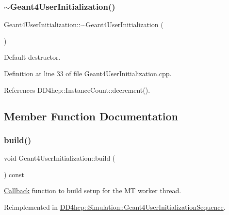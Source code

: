 \subsubsection{\texorpdfstring{$\sim$\+Geant4\+User\+Initialization()}{~Geant4UserInitialization()}}
{\footnotesize\ttfamily Geant4\+User\+Initialization\+::$\sim$\+Geant4\+User\+Initialization (\begin{DoxyParamCaption}{ }\end{DoxyParamCaption})\hspace{0.3cm}{\ttfamily [virtual]}}



Default destructor. 



Definition at line 33 of file Geant4\+User\+Initialization.\+cpp.



References D\+D4hep\+::\+Instance\+Count\+::decrement().



\subsection{Member Function Documentation}
\hypertarget{class_d_d4hep_1_1_simulation_1_1_geant4_user_initialization_a468385a353537baf52b1dbbcf6453010}{}\label{class_d_d4hep_1_1_simulation_1_1_geant4_user_initialization_a468385a353537baf52b1dbbcf6453010} 
\subsubsection{\texorpdfstring{build()}{build()}}
{\footnotesize\ttfamily void Geant4\+User\+Initialization\+::build (\begin{DoxyParamCaption}{ }\end{DoxyParamCaption}) const\hspace{0.3cm}{\ttfamily [virtual]}}



\hyperlink{class_d_d4hep_1_1_callback}{Callback} function to build setup for the MT worker thread. 



Reimplemented in \hyperlink{class_d_d4hep_1_1_simulation_1_1_geant4_user_initialization_sequence_a7805c4b772060132398bf2d02a83d4c2}{D\+D4hep\+::\+Simulation\+::\+Geant4\+User\+Initialization\+Sequence}.



